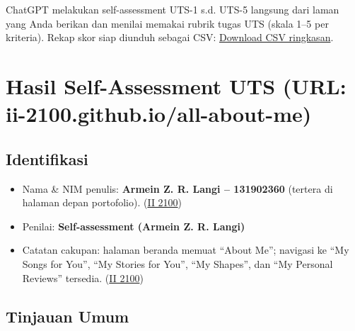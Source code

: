 \documentclass[
  letterpaper,
  DIV=11,
  numbers=noendperiod]{scrreprt}
\providecommand{\tightlist}{%
  \setlength{\itemsep}{0pt}\setlength{\parskip}{0pt}}
\begin{document}
ChatGPT melakukan self-assessment UTS-1 s.d. UTS-5 langsung dari laman
yang Anda berikan dan menilai memakai rubrik tugas UTS (skala 1--5 per
kriteria). Rekap skor siap diunduh sebagai CSV:
\href{sandbox:/mnt/data/UTS_self_assessment.csv}{Download CSV
ringkasan}.


\chapter{Hasil Self-Assessment UTS (URL:
ii-2100.github.io/all-about-me)}\label{hasil-self-assessment-uts-url-ii-2100.github.ioall-about-me}

\section{Identifikasi}\label{identifikasi}

\begin{itemize}
\tightlist
\item
  Nama \& NIM penulis: \textbf{Armein Z. R. Langi -- 131902360} (tertera
  di halaman depan portofolio).
  (\href{https://ii-2100.github.io/all-about-me/}{II 2100})
\item
  Penilai: \textbf{Self-assessment (Armein Z. R. Langi)}
\item
  Catatan cakupan: halaman beranda memuat ``About Me''; navigasi ke ``My
  Songs for You'', ``My Stories for You'', ``My Shapes'', dan ``My
  Personal Reviews'' tersedia.
  (\href{https://ii-2100.github.io/all-about-me/}{II 2100})
\end{itemize}

\section{Tinjauan Umum}\label{tinjauan-umum}
\end{document}
